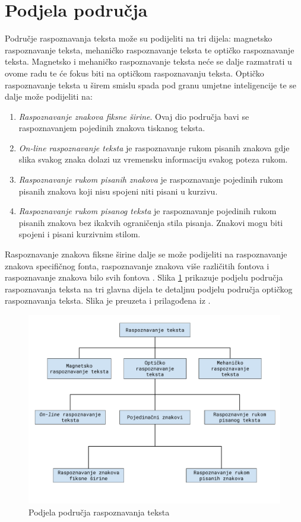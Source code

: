 \section{Podjela područja}
\label{sec:podjela-podrucja}
Područje raspoznavanja teksta može su podijeliti na tri dijela: magnetsko raspoznavanje teksta, mehaničko raspoznavanje
teksta te optičko raspoznavanje teksta. Magnetsko i mehaničko raspoznavanje teksta neće se dalje razmatrati u ovome
radu te će fokus biti na optičkom raspoznavanju teksta. Optičko raspoznavanje teksta u širem smislu spada pod granu
umjetne inteligencije \citep{mori1999} te se dalje može podijeliti na:
\begin{enumerate}
    \item \emph{Raspoznavanje znakova fiksne širine}. Ovaj dio područja bavi se raspoznavanjem pojedinih znakova
    tiskanog teksta.
    \item \emph{On-line raspoznavanje teksta} je raspoznavanje rukom pisanih znakova gdje slika svakog znaka dolazi uz
    vremensku informaciju svakog poteza rukom.
    \item \emph{Raspoznavanje rukom pisanih znakova} je raspoznavanje pojedinih rukom pisanih znakova koji nisu spojeni
    niti pisani u kurzivu.
    \item \emph{Raspoznavanje rukom pisanog teksta} je raspoznavanje pojedinih rukom pisanih znakova bez ikakvih
    ograničenja stila pisanja. Znakovi mogu biti spojeni i pisani kurzivnim stilom.
\end{enumerate}
Raspoznavanje znakova fiksne širine dalje se može podijeliti na raspoznavanje znakova specifičnog fonta, raspoznavanje
znakova više različitih fontova i raspoznavanje znakova bilo svih fontova \citep{govindan1989}.
Slika \ref{fig:podjela-podrucja-raspoznavanja-teksta} prikazuje podjelu područja raspoznavanja teksta na tri glavna
dijela te detaljnu podjelu područja optičkog raspoznavanja teksta. Slika je preuzeta i prilagođena
iz \citep{mantas1986}.

\begin{figure}[htb]
    \centering
    \includegraphics[width=12cm]{images/character-recognition-categories.pdf}
    \caption{Podjela područja raspoznavanja teksta}
    \label{fig:podjela-podrucja-raspoznavanja-teksta}
\end{figure}

